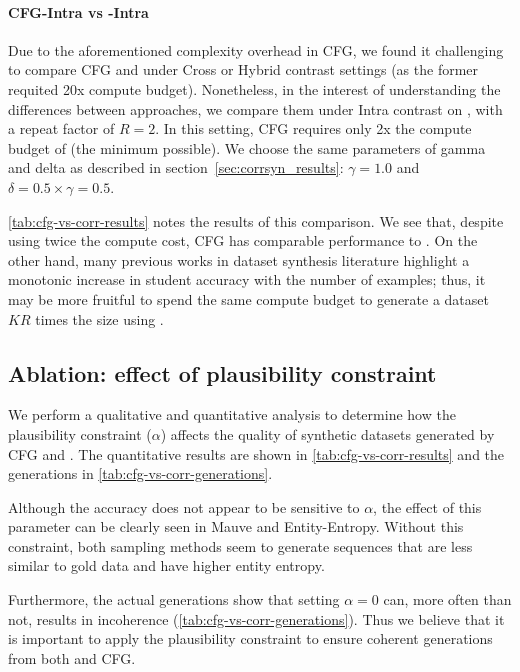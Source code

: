 \paragraph{\textsc{CFG}-Intra vs \corrsyn-Intra} Due to the aforementioned complexity overhead in CFG, we found it challenging to compare CFG and \corrsyn{} under Cross or Hybrid contrast settings (as the former requited 20x compute budget).  Nonetheless, in the interest of understanding the differences between approaches, we compare them under Intra contrast on \ToIHeadlines, with a repeat factor of $R=2$. In this setting, CFG requires only 2x the compute budget of \corrsyn (the minimum possible). We choose the same parameters of gamma and delta as described in section~\ref{sec:corrsyn_results}: $\gamma=1.0$ and $\delta = 0.5\times\gamma = 0.5$. 

\autoref{tab:cfg-vs-corr-results} notes the results of this comparison. We see that, despite using twice the compute cost, CFG has comparable performance to \corrsyn{}. On the other hand, many previous works in dataset synthesis literature \citep{ye2022zerogen, ye2022progen, gao2023selfguided, meng_supergen} highlight a monotonic increase in student accuracy with the number of examples; thus, it may be more fruitful to spend the same compute budget to generate a dataset $KR$ times the size using \corrsyn.


\subsection{Ablation: effect of plausibility constraint}

We perform a qualitative and quantitative analysis to determine how the plausibility constraint ($\alpha$) affects the quality of synthetic datasets generated by CFG and \corrsyn{}. The quantitative results are shown in \autoref{tab:cfg-vs-corr-results} and the generations in \autoref{tab:cfg-vs-corr-generations}. 

Although the accuracy does not appear to be sensitive to $\alpha$, the effect of this parameter can be clearly seen in Mauve and Entity-Entropy. Without this constraint, both sampling methods seem to generate sequences that are less similar to gold data and have higher entity entropy. 

Furthermore, the actual generations show that setting $\alpha=0$ can, more often than not, results in incoherence (\autoref{tab:cfg-vs-corr-generations}). Thus we believe that it is important to apply the plausibility constraint to ensure coherent generations from both \corrsyn{} and \textsc{CFG}.


